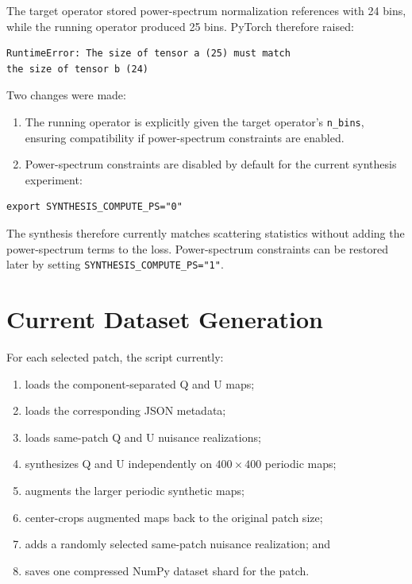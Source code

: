 \documentclass[11pt]{article}
\begin{document}
The target operator stored power-spectrum normalization references with 24
bins, while the running operator produced 25 bins.  PyTorch therefore raised:

\begin{lstlisting}
RuntimeError: The size of tensor a (25) must match
the size of tensor b (24)
\end{lstlisting}

Two changes were made:

\begin{enumerate}
  \item The running operator is explicitly given the target operator's
        \texttt{n\_bins}, ensuring compatibility if power-spectrum constraints
        are enabled.
  \item Power-spectrum constraints are disabled by default for the current
        synthesis experiment:
\end{enumerate}

\begin{lstlisting}
export SYNTHESIS_COMPUTE_PS="0"
\end{lstlisting}

The synthesis therefore currently matches scattering statistics without adding
the power-spectrum terms to the loss.  Power-spectrum constraints can be
restored later by setting \texttt{SYNTHESIS\_COMPUTE\_PS="1"}.

\section{Current Dataset Generation}

For each selected patch, the script currently:

\begin{enumerate}
  \item loads the component-separated Q and U maps;
  \item loads the corresponding JSON metadata;
  \item loads same-patch Q and U nuisance realizations;
  \item synthesizes Q and U independently on $400 \times 400$ periodic maps;
  \item augments the larger periodic synthetic maps;
  \item center-crops augmented maps back to the original patch size;
  \item adds a randomly selected same-patch nuisance realization; and
  \item saves one compressed NumPy dataset shard for the patch.
\end{enumerate}
\end{document}

